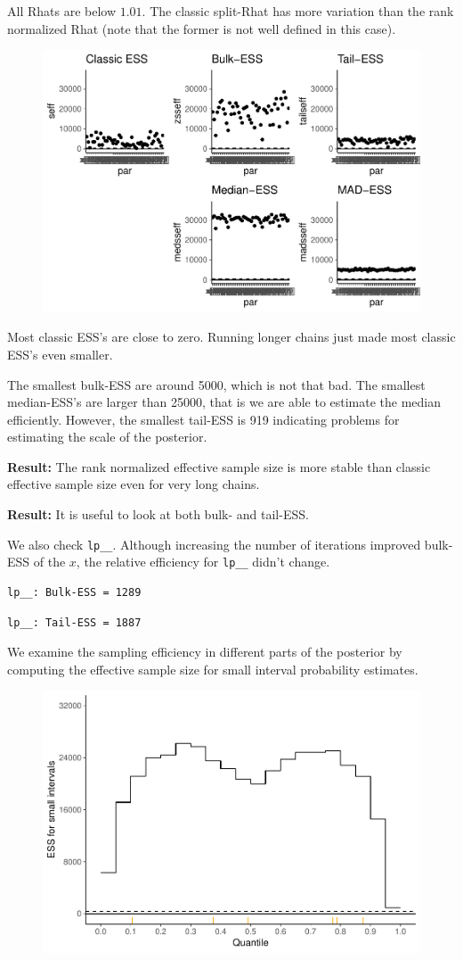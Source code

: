 \documentclass[american,]{article}
\begin{document}
All Rhats are below \(1.01\). The classic split-Rhat has more variation
than the rank normalized Rhat (note that the former is not well defined
in this case).

\begin{figure}[tp]
  \centering
  \includegraphics[width=0.6\linewidth]{graphics/ess-fit-nom-td20l-1.pdf}
\end{figure}

Most classic ESS's are close to zero. Running longer chains just made
most classic ESS's even smaller.

The smallest bulk-ESS are around 5000, which is not that bad. The
smallest median-ESS's are larger than 25000, that is we are able to
estimate the median efficiently. However, the smallest tail-ESS is 919
indicating problems for estimating the scale of the posterior.

\textbf{Result:} The rank normalized effective sample size is more
stable than classic effective sample size even for very long chains.

\textbf{Result:} It is useful to look at both bulk- and tail-ESS.

We also check \texttt{lp\_\_}. Although increasing the number of
iterations improved bulk-ESS of the \(x\), the relative efficiency for
\texttt{lp\_\_} didn't change.

\begin{verbatim}
lp__: Bulk-ESS = 1289
\end{verbatim}

\begin{verbatim}
lp__: Tail-ESS = 1887
\end{verbatim}

We examine the sampling efficiency in different parts of the posterior
by computing the effective sample size for small interval probability
estimates.

\begin{figure}[tp]
  \centering
  \includegraphics[width=0.6\linewidth]{graphics/local-ess-fit-nom-td20l-1.pdf}
\end{figure}
\end{document}

